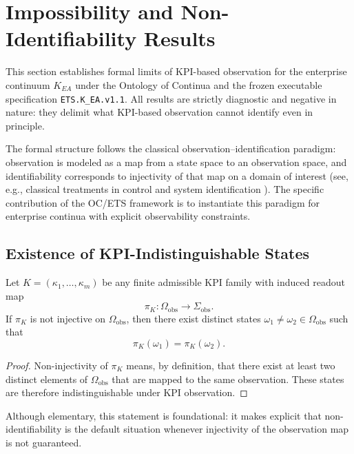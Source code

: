 ﻿\section{Impossibility and Non-Identifiability Results}
\label{sec:impossibility}

This section establishes formal limits of KPI-based observation for the
enterprise continuum \(K_{EA}\) under the Ontology of Continua and the frozen
executable specification \texttt{ETS.K\_EA.v1.1}.
All results are strictly diagnostic and negative in nature: they delimit what
KPI-based observation cannot identify even in principle.

The formal structure follows the classical observation--identification
paradigm: observation is modeled as a map from a state space to an observation
space, and identifiability corresponds to injectivity of that map on a domain of
interest (see, e.g., classical treatments in control and system identification
\cite{kalman1960,ljung1999,walter1997}).
The specific contribution of the OC/ETS framework is to instantiate this
paradigm for enterprise continua with explicit observability constraints.

\subsection{Existence of KPI-Indistinguishable States}

\begin{theorem}
\label{thm:nonident}
Let \(K=(\kappa_1,\ldots,\kappa_m)\) be any finite admissible KPI family with
induced readout map
\[
\pi_K:\Omega_{\mathrm{obs}}\to\Sigma_{\mathrm{obs}}.
\]
If \(\pi_K\) is not injective on \(\Omega_{\mathrm{obs}}\), then there exist
distinct states
\(\omega_1\neq\omega_2\in\Omega_{\mathrm{obs}}\) such that
\[
\pi_K(\omega_1)=\pi_K(\omega_2).
\]
\end{theorem}

\begin{proof}
Non-injectivity of \(\pi_K\) means, by definition, that there exist at least two
distinct elements of \(\Omega_{\mathrm{obs}}\) that are mapped to the same
observation.
These states are therefore indistinguishable under KPI observation.
\end{proof}

Although elementary, this statement is foundational: it makes explicit that
non-identifiability is the default situation whenever injectivity of the
observation map is not guaranteed.


